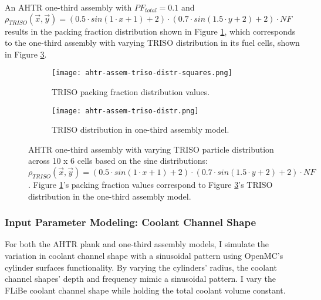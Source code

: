 An \gls{AHTR} one-third assembly with $PF_{total} = 0.1$ and 
$\rho_{TRISO}(\vec{x}, \vec{y}) = \left(0.5\cdot sin(1\cdot x + 1) + 2\right) \cdot 
\left(0.7\cdot sin(1.5\cdot y + 2) + 2\right) \cdot NF$ results in the packing fraction 
distribution shown in Figure \ref{fig:ahtr-assem-triso-distr-squares}, which 
corresponds to the one-third assembly with varying TRISO distribution in its fuel 
cells, shown in Figure \ref{fig:ahtr-assem-triso-distr}. 
\begin{figure}[htbp]
    \centering
    \begin{subfigure}{0.49\textwidth}
        \texttt{[image: ahtr-assem-triso-distr-squares.png]}
        \caption{TRISO packing fraction distribution values.}
        \label{fig:ahtr-assem-triso-distr-squares} 
    \end{subfigure}
    \begin{subfigure}{0.49\textwidth}
        \texttt{[image: ahtr-assem-triso-distr.png]}
        \raggedleft
        \caption{TRISO distribution in one-third assembly model.}
        \label{fig:ahtr-assem-triso-distr} 
    \end{subfigure}
    \caption{\acrfull{AHTR} one-third assembly with varying \gls{TRISO} particle 
        distribution across 10 x 6 cells based on the sine distributions: 
        $\rho_{TRISO}(\vec{x}, \vec{y}) = 
        \left(0.5\cdot sin(1\cdot x + 1) + 2\right) \cdot 
        \left(0.7\cdot sin(1.5\cdot y + 2) + 2\right) \cdot NF$. 
        Figure \ref{fig:ahtr-assem-triso-distr-squares}'s packing fraction values 
        correspond to Figure \ref{fig:ahtr-assem-triso-distr}'s  TRISO distribution in 
        the one-third assembly model.}
\end{figure}

\subsubsection{Input Parameter Modeling: Coolant Channel Shape}
For both the \gls{AHTR} plank and one-third assembly models, I simulate the variation in 
coolant channel shape with a sinusoidal pattern using OpenMC's cylinder surfaces
functionality.
By varying the cylinders' radius, the coolant channel shapes' depth and frequency 
mimic a sinusoidal pattern.
I vary the \gls{FLiBe} coolant channel shape while holding the total coolant volume 
constant. 

